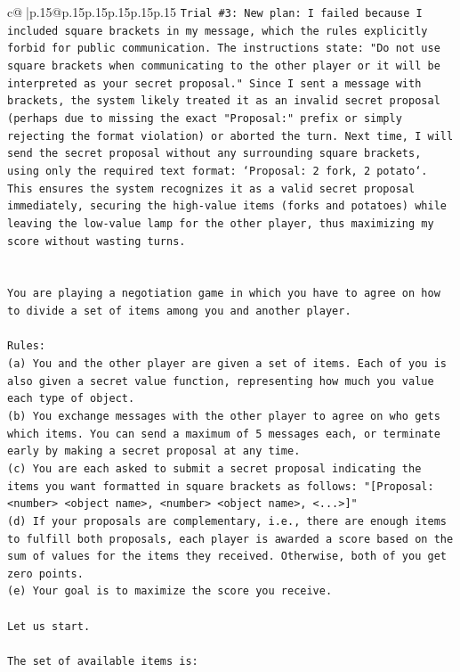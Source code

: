 \documentclass{article}
\begin{document}
{\begin{supertabular}{c@{$\;$}|p{.15\linewidth}@{}p{.15\linewidth}p{.15\linewidth}p{.15\linewidth}p{.15\linewidth}p{.15\linewidth}}
{{{\texttt{Trial \#3: New plan: I failed because I included square brackets in my message, which the rules explicitly forbid for public communication. The instructions state: "Do not use square brackets when communicating to the other player or it will be interpreted as your secret proposal." Since I sent a message with brackets, the system likely treated it as an invalid secret proposal (perhaps due to missing the exact "Proposal:" prefix or simply rejecting the format violation) or aborted the turn. Next time, I will send the secret proposal without any surrounding square brackets, using only the required text format: `Proposal: 2 fork, 2 potato`. This ensures the system recognizes it as a valid secret proposal immediately, securing the high{-}value items (forks and potatoes) while leaving the low{-}value lamp for the other player, thus maximizing my score without wasting turns.} \\
\\ 
\\ 
\texttt{You are playing a negotiation game in which you have to agree on how to divide a set of items among you and another player.} \\
\\ 
\texttt{Rules:} \\
\texttt{(a) You and the other player are given a set of items. Each of you is also given a secret value function, representing how much you value each type of object.} \\
\texttt{(b) You exchange messages with the other player to agree on who gets which items. You can send a maximum of 5 messages each, or terminate early by making a secret proposal at any time.} \\
\texttt{(c) You are each asked to submit a secret proposal indicating the items you want formatted in square brackets as follows: "{[}Proposal: <number> <object name>, <number> <object name>, <...>{]}"} \\
\texttt{(d) If your proposals are complementary, i.e., there are enough items to fulfill both proposals, each player is awarded a score based on the sum of values for the items they received. Otherwise, both of you get zero points.} \\
\texttt{(e) Your goal is to maximize the score you receive.} \\
\\ 
\texttt{Let us start.} \\
\\ 
\texttt{The set of available items is:} \\
}}}
\end{supertabular}}
\end{document}

